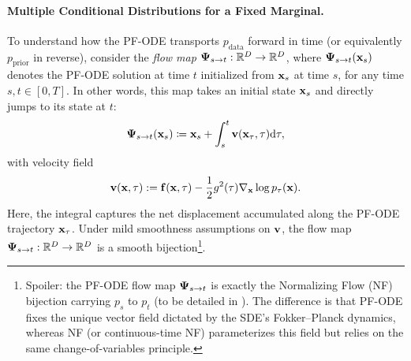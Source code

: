 


\paragraph{Multiple Conditional Distributions for a Fixed Marginal.}
To understand how the PF-ODE transports $p_{\mathrm{data}}$ forward in time (or equivalently $p_{\mathrm{prior}}$ in reverse), consider the \emph{flow map} ${\bm{\Psi}}_{s \to t}: \mathbb{R}^D \to \mathbb{R}^D$, where ${\bm{\Psi}}_{s \to t}({\mathbf{x}}_s)$ denotes the PF-ODE solution at time $t$ initialized from ${\mathbf{x}}_s$ at time $s$, for any time $s, t \in[0,T]$. In other words, this map takes an initial state ${\mathbf{x}}_s$ and directly jumps to its state at $t$:
\begin{align}\label{eq:flow-map-def}
{\bm{\Psi}}_{s \to t}({\mathbf{x}}_s) \coloneqq {\mathbf{x}}_s + \int_s^t {\mathbf{v}}({\mathbf{x}}_\tau, \tau)\mathrm{d}\tau,
\end{align}
with velocity field
\begin{align*}
{\mathbf{v}}({\mathbf{x}}, \tau) := {\mathbf{f}}({\mathbf{x}}, \tau) - \frac{1}{2} g^2(\tau)\nabla_{{\mathbf{x}}}\log p_\tau({\mathbf{x}}).
\end{align*}
Here, the integral captures the net displacement accumulated along the PF-ODE trajectory ${\mathbf{x}}_\tau$. Under mild smoothness assumptions on ${\mathbf{v}}$, the flow map ${\bm{\Psi}}_{s \to t}: \mathbb{R}^D \to \mathbb{R}^D$ is a smooth bijection\footnote{Spoiler: the PF-ODE flow map ${\bm{\Psi}}_{s\to t}$ is exactly the Normalizing Flow (NF) bijection carrying $p_s$ to $p_t$ (to be detailed in ). The difference is that PF-ODE fixes the unique vector field dictated by the SDE’s Fokker–Planck dynamics, whereas NF (or continuous-time NF) parameterizes this field but relies on the same change-of-variables principle.
}.




